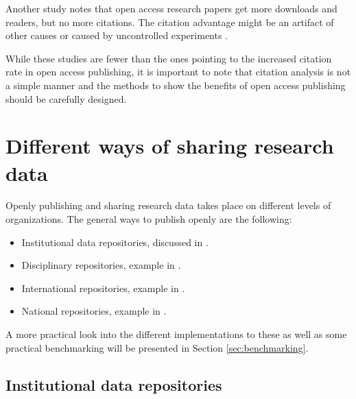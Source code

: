 Another study notes that open access research papers get more downloads and
readers, but no more citations. The citation advantage might be an artifact
of other causes or caused by uncontrolled experiments \cite{davis2008open}.

While these studies are fewer than the ones pointing to the increased citation
rate in open access publishing, it is important to note that citation analysis
is not a simple manner and the methods to show the benefits of open access
publishing should be carefully designed.

\section{Different ways of sharing research data}

Openly publishing and sharing research data takes place on different levels of
organizations. The general ways to publish openly are the following:

\begin{itemize}
    \item Institutional data repositories, discussed in \cite{cragin2010data}.
    \item Disciplinary repositories, example in \cite{DBLP:journals/nar/EdgarDL03}.
    \item International repositories, example in \cite{2013EGUGA..15.7202L}.
    \item National repositories, example in \cite{cimino2010clinical}.
\end{itemize}

A more practical look into the different implementations to these as well as
some practical benchmarking will be presented in Section \ref{sec:benchmarking}.

\iffalse

\subsection{Institutional data repositories}

